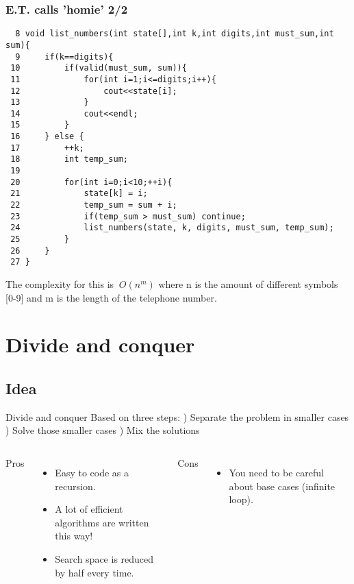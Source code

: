 \documentclass[article]{beamer}
\begin{document}
\begin{frame}[fragile]
	\frametitle{E.T. calls 'homie' 2/2}
	{\tiny
	\begin{lstlisting}
  8 void list_numbers(int state[],int k,int digits,int must_sum,int sum){
  9     if(k==digits){
 10         if(valid(must_sum, sum)){
 11             for(int i=1;i<=digits;i++){
 12                 cout<<state[i];
 13             }   
 14             cout<<endl;
 15         }   
 16     } else {
 17         ++k;
 18         int temp_sum;
 19 
 20         for(int i=0;i<10;++i){
 21             state[k] = i;
 22             temp_sum = sum + i;
 23             if(temp_sum > must_sum) continue;
 24             list_numbers(state, k, digits, must_sum, temp_sum);
 25         }   
 26     }
 27 }
	\end{lstlisting}
	}
	The complexity for this is $~O(n^{m})$ where n is the amount of different symbols [0-9] and m is the length of the telephone number.
\end{frame}

\section{Divide and conquer}
\subsection{Idea}

\begin{frame}[fragile]
	\begin{block}{Divide and conquer}
	Based on three steps: ) Separate the problem in smaller cases ) Solve those smaller cases ) Mix the solutions
	\end{block}
\end{frame}

\begin{frame}[fragile]
	\begin{columns}
		Pros
		\begin{itemize}
			\item Easy to code as a recursion.
			\item A lot of efficient algorithms
				are written this way!
			\item Search space is reduced by half every time.
		\end{itemize}
		Cons
		\begin{itemize}
			\item You need to be careful about 
				base cases (infinite loop).
		\end{itemize}
	\end{columns}
\end{frame}
\end{document}

